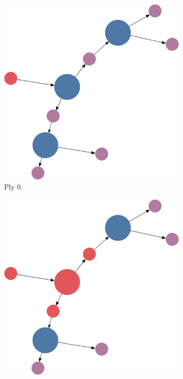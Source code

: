 \documentclass[titlepage,11pt]{article}
\begin{document}
\begin{figure}
	\begin{subfigure}[!htb]{0.32\textwidth}
		\centering
		\includegraphics[width=\columnwidth]{figures/knn_simple_forward_think_0.pdf}
		\caption{Ply 0.}
	\end{subfigure}
	\begin{subfigure}[!htb]{0.32\textwidth}
		\centering
		\includegraphics[width=\columnwidth]{figures/knn_simple_forward_think_1.pdf}

\end{subfigure}
\end{figure}
\end{document}
